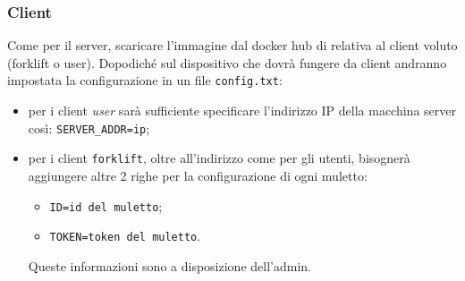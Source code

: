     \subsubsection{Client}
    Come per il server, scaricare l'immagine dal docker hub di \group{} relativa al client voluto (forklift o user). Dopodiché sul dispositivo che dovrà fungere da client andranno impostata la configurazione in un file \texttt{config.txt}:
    \begin{itemize}
        \item per i client \textit{user} sarà sufficiente specificare l'indirizzo IP della macchina server così: \texttt{SERVER\_ADDR=ip};
        \item per i client \texttt{forklift}, oltre all'indirizzo come per gli utenti, bisognerà aggiungere altre 2 righe per la configurazione di ogni muletto:
        \begin{itemize}
            \item \texttt{ID=id del muletto};
            \item \texttt{TOKEN=token del muletto}.
        \end{itemize}
        Queste informazioni sono a disposizione dell'admin.
    \end{itemize}


